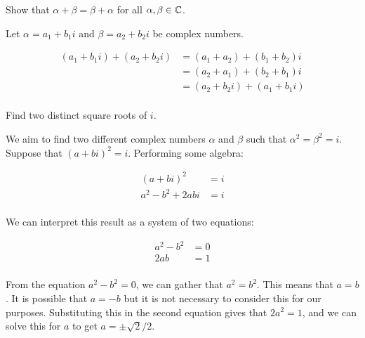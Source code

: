 \documentclass[../main.tex]{subfiles}
\begin{document}
\begin{exercise}
  Show that $\alpha + \beta = \beta + \alpha$ for all $\alpha, \beta \in \mathbb{C}$.
\end{exercise}

\begin{solution}
  Let $\alpha = a_1 + b_1i$ and $\beta = a_2 + b_2i$ be complex numbers.

  \[
    \begin{aligned}
      (a_1 + b_1i) + (a_2 + b_2i)
        & = (a_1 + a_2) + (b_1 + b_2)i  \\
        & = (a_2 + a_1) + (b_2 + b_1)i  \\
        & = (a_2 + b_2i) + (a_1 + b_1i) \\
    \end{aligned}
  \]
\end{solution}

\begin{exercise}
  Find two distinct square roots of $i$.
\end{exercise}

\begin{solution}
  We aim to find two different complex numbers $\alpha$ and $\beta$ such that
  $\alpha^2 = \beta^2 = i$. Suppose that $(a + bi)^2 = i$. Performing some
  algebra:

  \[
    \begin{aligned}
      (a + bi)^2       & = i \\
      a^2 - b^2 + 2abi & = i \\
    \end{aligned}
  \]

  We can interpret this result as a system of two equations:

  \[
    \begin{aligned}
      a^2 - b^2 & = 0 \\
      2ab       & = 1 \\
    \end{aligned}
  \]

  From the equation $a^2 - b^2 = 0$, we can gather that $a^2 = b^2$. This means
  that $a = b$. It is possible that $a = -b$ but it is not necessary to
  consider this for our purposes. Substituting this in the second equation
  gives that $2a^2 = 1$, and we can solve this for $a$ to get $a = \pm
  \sqrt{2}/2$.
\end{solution}
\end{document}
